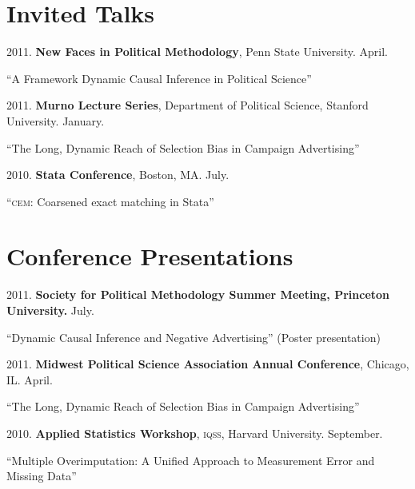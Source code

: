 \documentclass[margin,line]{res}
\newenvironment{list1}{
  \begin{list}{\ding{113}}{%
      \setlength{\itemsep}{0in}
      \setlength{\parsep}{0in} \setlength{\parskip}{0in}
      \setlength{\topsep}{0in} \setlength{\partopsep}{0in} 
      \setlength{\leftmargin}{0.83 cm}}}{\end{list}}
\begin{document}
\begin{resume}
\section{\textsf{\sc Invited Talks}}
2011. {\bf New Faces in Political Methodology}, Penn State University. April. 
\begin{list1} 
\item[] “A Framework Dynamic Causal Inference in Political Science”
\end{list1} \vspace{-0em}
2011. {\bf Murno Lecture Series}, Department of Political Science, Stanford University. January. 
\begin{list1} 
\item[] “The Long, Dynamic Reach of Selection Bias in Campaign Advertising”
\end{list1} \vspace{-0em}
2010. {\bf Stata Conference}, Boston, MA. July.
\begin{list1}
\item[] “\textsc{cem}: Coarsened exact matching in Stata”
\end{list1}\vspace{-.5em}
\section{\textsf{\sc Conference Presentations}}

2011. {\bf Society for Political Methodology  Summer Meeting, Princeton University.} July.
\begin{list1}
\item[] “Dynamic Causal Inference and Negative Advertising” (Poster presentation)
\end{list1}\vspace{-0em}

2011. {\bf Midwest Political Science Association Annual Conference}, Chicago, IL. April.
\begin{list1}
\item[] “The Long, Dynamic Reach of Selection Bias in Campaign Advertising”
\end{list1}\vspace{-0em}

2010. {\bf Applied Statistics Workshop}, \textsc{iqss}, Harvard University. September.
\begin{list1}
\item[] “Multiple Overimputation: A Unified Approach to Measurement Error and
Missing Data”
\end{list1}\vspace{-0em}


\end{resume}
\end{document}
